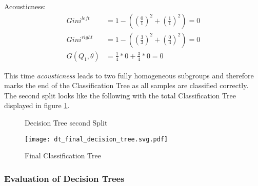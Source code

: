   Acousticness: 
  \begin{equation*}
    \begin{aligned}
        Gini^{left} &= 1 - ((\frac{0}{1})^2 + (\frac{1}{1})^2) = 0
        \\
        Gini^{right}  &= 1 - ((\frac{3}{3})^2 + (\frac{0}{3})^2) = 0
        \\
        G(Q_{1},\theta) &= \frac{1}{4} * 0 + \frac{3}{4} * 0 = 0
\end{aligned}
\end{equation*}

This time \emph{acousticness} leads to two fully homogeneous subgroups and therefore marks the end of the Classification Tree as all samples are 
classified correctly. The second split looks like the following with the total Classification Tree displayed in figure \ref{fig:theory_second_split}.

\begin{figure}[H]
    \centering
    \qquad
    \caption{Decision Tree second Split}%
    \label{fig:theory_second_split}%
\end{figure}


\begin{figure}[H]
    \centering
    \caption[]{Final Classification Tree}
	\label{fig:dt_final_decision_tree}
    \texttt{[image: dt\_final\_decision\_tree.svg.pdf]}
\end{figure}

%

\subsubsection{Evaluation of Decision Trees}

